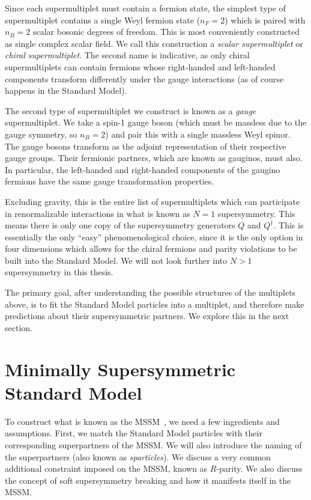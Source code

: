Since each supermultiplet must contain a fermion state, the simplest type of supermultiplet contains a single Weyl fermion state ($n_F = 2$) which is paired with $n_B = 2$ scalar bosonic degrees of freedom.
This is most conveniently constructed as single complex scalar field.
We call this construction a \textit{scalar supermultiplet} or \textit{chiral supermultiplet}.
The second name is indicative, as only chiral supermultiplets can contain fermions whose right-handed and left-handed components transform differently under the gauge interactions (as of course happens in the Standard Model).

The second type of supermultiplet we construct is known as a \textit{gauge} supermultiplet.
We take a spin-1 gauge boson (which must be massless due to the gauge symmetry, so $n_B = 2$) and pair this with a single massless Weyl spinor\footnotemark.
The gauge bosons transform as the adjoint representation of their respective gauge groups.
Their fermionic partners, which are known as gauginos, must also.
In particular, the left-handed and right-handed components of the gaugino fermions have the same gauge transformation properties.

Excluding gravity, this is the entire list of supermultiplets which can participate in renormalizable interactions in what is known as $N=1$ supersymmetry.
This means there is only one copy of the supersymmetry generators $Q$ and $Q^\dagger$.
This is essentially the only ``easy'' phenomenological choice, since it is the only option in four dimensions which allows for the chiral fermions and parity violations to be built into the Standard Model.
We will not look further into $N>1$ supersymmetry in this thesis.

The primary goal, after understanding the possible structures of the multiplets above, is to fit the Standard Model particles into a multiplet, and therefore make predictions about their supersymmetric partners.
We explore this in the next section.

\section{Minimally Supersymmetric Standard Model}

To construct what is known as the MSSM~\cite{Dimopoulos:1981zb,Dimopoulos:1981yj,Ibanez:1981yh,Marciano:1981un,susyPrimer}, we need a few ingredients and assumptions.
First, we match the Standard Model particles with their corresponding superpartners of the MSSM.
We will also introduce the naming of the superpartners (also known as \textit{sparticles}).
We discuss a very common additional constraint imposed on the MSSM, known as $R$-parity.
We also discuss the concept of soft supersymmetry breaking and how it manifests itself in the MSSM.

